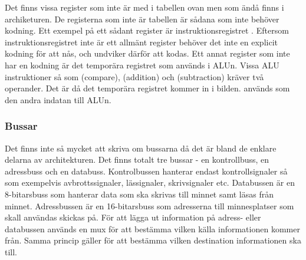 \documentclass[main.tex]{subfiles}
\begin{document}
Det finns vissa register som inte är med i tabellen ovan men som ändå finns i
archiketuren. De registerna som inte är tabellen är sådana som inte behöver
kodning. Ett exempel på ett sådant register är instruktionsregistret .
Eftersom instruktionsregistret inte är ett allmänt register behöver det inte en
explicit kodning för att nås, och undviker därför att kodas. Ett annat register
som inte har en kodning är det temporära registret som används i ALUn.  Vissa
ALU instruktioner så som  (compare),  (addition) och
 (subtraction) kräver två operander. Det är då det temporära
registret  kommer in i bilden.  används som den andra
indatan till ALUn.

\subsubsection{Bussar}
Det finns inte så mycket att skriva om bussarna då det är bland de enklare
delarna av architekturen. Det finns totalt tre bussar - en kontrollbuss, en
adressbuss och en databuss. Kontrolbussen hanterar endast kontrollsignaler så
som exempelvis avbrottssignaler, lässignaler, skrivsignaler etc. Databussen är
en 8-bitarsbuss som hanterar data som ska skrivas till minnet samt läsas från
minnet. Adressbussen är en 16-bitarsbuss som adresserna till minnesplatser som
skall användas skickas på. För att lägga ut information på adress- eller
databussen används en mux för att bestämma vilken källa informationen kommer
från. Samma princip gäller för att bestämma vilken destination informationen
ska till.
\end{document}
